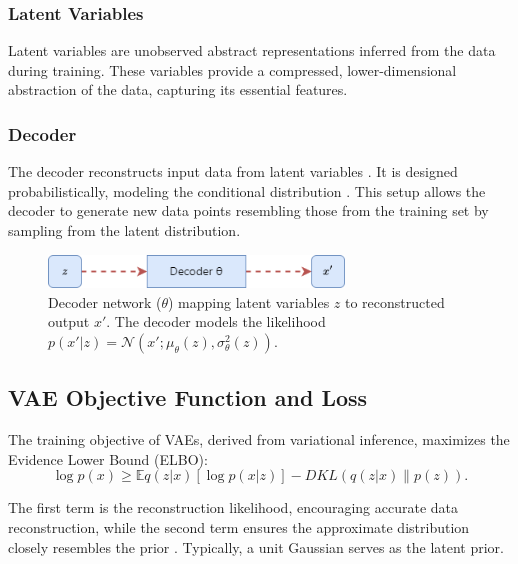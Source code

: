 \subsubsection{Latent Variables}
Latent variables  are unobserved abstract representations inferred from the data during training. These variables provide a compressed, lower-dimensional abstraction of the data, capturing its essential features.

\subsubsection{Decoder}
The decoder reconstructs input data  from latent variables . It is designed probabilistically, modeling the conditional distribution . This setup allows the decoder to generate new data points resembling those from the training set by sampling from the latent distribution.
\begin{figure}[htbp]
    \centering
    \includegraphics[width=0.7\textwidth]{img/vae/decoder_figure.png}
    \caption{Decoder network ($\theta$) mapping latent variables $z$ to reconstructed output $x'$. The decoder models the likelihood $p(x'|z) = \mathcal{N}(x'; \mu_\theta(z), \sigma_\theta^2(z))$.}
    \label{fig:decoder}
\end{figure}


\subsection{VAE Objective Function and Loss} \label{subsec:VAE Objective Function and Loss}
The training objective of VAEs, derived from variational inference, maximizes the Evidence Lower Bound (ELBO):
\begin{equation}
\log p(x) \geq \mathbb{E}{q(z|x)}[\log p(x|z)] - D{KL}(q(z|x) \parallel p(z)).
\end{equation}

The first term is the reconstruction likelihood, encouraging accurate data reconstruction, while the second term ensures the approximate distribution  closely resembles the prior . Typically, a unit Gaussian  serves as the latent prior.

